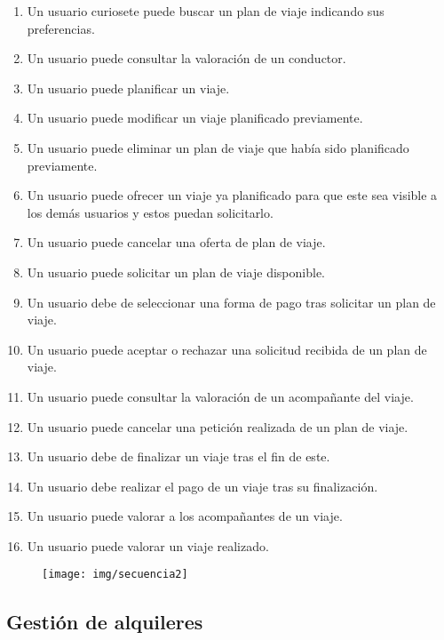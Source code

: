 		\begin{enumerate}
			\item Un usuario curiosete puede buscar un plan de viaje indicando sus preferencias.
			\item Un usuario puede consultar la valoración de un conductor.
			\item Un usuario puede planificar un viaje.
			\item Un usuario puede modificar un viaje planificado previamente.
			\item Un usuario puede eliminar un plan de viaje que había sido planificado previamente.
			\item Un usuario puede ofrecer un viaje ya planificado para que este sea visible a los demás usuarios y estos puedan solicitarlo.
			\item Un usuario puede cancelar una oferta de plan de viaje.
			\item Un usuario puede solicitar un plan de viaje disponible.
			\item Un usuario debe de seleccionar una forma de pago tras solicitar un plan de viaje.
			\item Un usuario puede aceptar o rechazar una solicitud recibida de un plan de viaje.
			\item Un usuario puede consultar la valoración de un acompañante del viaje.
			\item Un usuario puede cancelar una petición realizada de un plan de viaje.
			\item Un usuario debe de finalizar un viaje tras el fin de este.
			\item Un usuario debe realizar el pago de un viaje tras su finalización.
			\item Un usuario puede valorar a los acompañantes de un viaje.
			\item Un usuario puede valorar un viaje realizado.
		\end{enumerate}

		\begin{figure}[H]
			\centering
			\texttt{[image: img/secuencia2]}
			\label{fig:secuencia2}
		\end{figure}
		
		\newpage
		\subsection{Gestión de alquileres}
		

